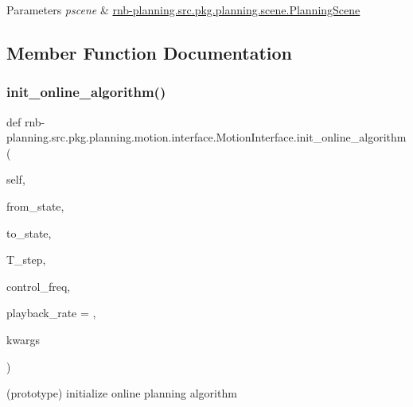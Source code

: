 \begin{DoxyParams}{Parameters}
{\em pscene} & \hyperlink{classrnb-planning_1_1src_1_1pkg_1_1planning_1_1scene_1_1_planning_scene}{rnb-\/planning.\+src.\+pkg.\+planning.\+scene.\+Planning\+Scene} \\
\hline
\end{DoxyParams}


\subsection{Member Function Documentation}
\mbox{\label{classrnb-planning_1_1src_1_1pkg_1_1planning_1_1motion_1_1interface_1_1_motion_interface_a46e6b1127c9db739624eb637823cd6f0}} 
\subsubsection{\texorpdfstring{init\+\_\+online\+\_\+algorithm()}{init\_online\_algorithm()}}
{\footnotesize\ttfamily def rnb-\/planning.\+src.\+pkg.\+planning.\+motion.\+interface.\+Motion\+Interface.\+init\+\_\+online\+\_\+algorithm (\begin{DoxyParamCaption}\item[{}]{self,  }\item[{}]{from\+\_\+state,  }\item[{}]{to\+\_\+state,  }\item[{}]{T\+\_\+step,  }\item[{}]{control\+\_\+freq,  }\item[{}]{playback\+\_\+rate = {},  }\item[{}]{kwargs }\end{DoxyParamCaption})}



(prototype) initialize online planning algorithm 


